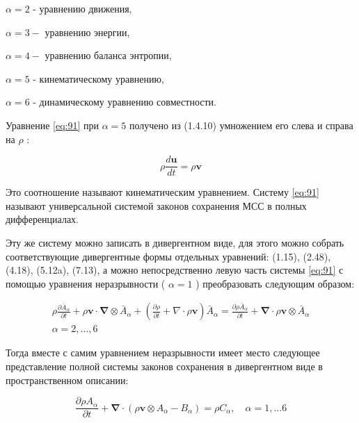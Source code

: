 $\alpha=2$ - уравнению движения,

$\alpha=3-$ уравнению энергии,

$\alpha=4-$ уравнению баланса энтропии,

$\alpha=5$ - кинематическому уравнению,

$\alpha=6$ - динамическому уравнению совместности.

Уравнение \eqref{eq:91} при $\alpha=5$ получено из (1.4.10) умножением его слева и справа на $\rho$ :

\begin{equation}
\rho \frac{d \mathbf{u}}{d t}=\rho \mathbf{v} \label{eq:93}
\end{equation}


Это соотношение называют кинематическим уравнением. Систему \eqref{eq:91} называют универсальной системой законов сохранения МСС в полных дифференциалах.

Эту же систему можно записать в дивергентном виде, для этого можно собрать соответствующие дивергентные формы отдельных уравнений: (1.15), (2.48), (4.18), (5.12a), (7.13), а можно непосредственно левую часть системы \eqref{eq:91} с помощью уравнения неразрывности ( $\alpha=1$ ) преобразовать следующим образом:

\begin{gather*}
\rho \frac{\partial \bar{A}_{\alpha}}{\partial t}+\rho \mathbf{v} \cdot \boldsymbol{\nabla} \otimes \bar{A}_{\alpha}+\left(\frac{\partial \rho}{\partial t}+\nabla \cdot \rho \mathbf{v}\right) \bar{A}_{\alpha}=\frac{\partial \rho \bar{A}_{\alpha}}{\partial t}+\boldsymbol{\nabla} \cdot \rho \mathbf{v} \otimes \bar{A}_{\alpha} \\
\alpha=2, \ldots, 6 \label{eq:94}
\end{gather*}


Тогда вместе с самим уравнением неразрывности имеет место следующее представление полной системы законов сохранения в дивергентном виде в пространственном описании:


\begin{equation}
\frac{\partial \rho A_{\alpha}}{\partial t}+\boldsymbol{\nabla} \cdot\left(\rho \mathbf{v} \otimes A_{\alpha}-B_{\alpha}\right)=\rho C_{\alpha}, \quad \alpha=1, \ldots 6 \label{eq:95}
\end{equation}


